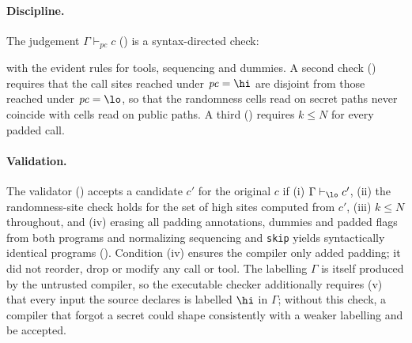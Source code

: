 \paragraph{Discipline.} The judgement $\Gamma \vdash_{\mathit{pc}} c$ () is a syntax-directed check:
with the evident rules for tools, sequencing and dummies. A second check () requires that the call sites reached under $\mathit{pc}=\hi$ are disjoint from those reached under $\mathit{pc}=\lo$, so that the randomness cells read on secret paths never coincide with cells read on public paths. A third () requires $k \le N$ for every padded call.

\paragraph{Validation.} The validator () accepts a candidate $c'$ for the original $c$ if (i) $\Gamma \vdash_{\lo} c'$, (ii) the randomness-site check holds for the set of high sites computed from $c'$, (iii) $k \le N$ throughout, and (iv) erasing all padding annotations, dummies and padded flags from both programs and normalizing sequencing and \texttt{skip} yields syntactically identical programs (). Condition (iv) ensures the compiler only added padding; it did not reorder, drop or modify any call or tool. The labelling $\Gamma$ is itself produced by the untrusted compiler, so the executable checker additionally requires (v) that every input the source declares  is labelled $\hi$ in $\Gamma$; without this check, a compiler that forgot a secret could shape consistently with a weaker labelling and be accepted.

